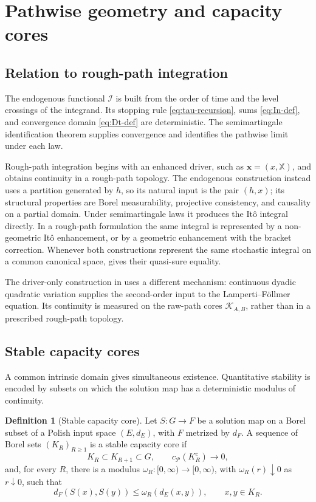 \documentclass[11pt,reqno]{amsart}
\theoremstyle{plain}
\theoremstyle{definition}
\newtheorem{definition}[definition]{Definition}
\newcommand{\cI}{\mathcal I}
\newcommand{\cK}{\mathcal K}
\newcommand{\cP}{\mathcal P}
\begin{document}
\section{Pathwise geometry and capacity cores}
\label{sec:geometry}

\subsection{Relation to rough-path integration}

The endogenous functional \(\cI\) is built from the order of time and the
level crossings of the integrand.  Its stopping rule
\eqref{eq:tau-recursion}, sums \eqref{eq:In-def}, and convergence domain
\eqref{eq:Dt-def} are deterministic.  The semimartingale identification
theorem supplies convergence and identifies the pathwise limit under each
law.

Rough-path integration begins with an enhanced driver, such as
\(\mathbf x=(x,\mathbb X)\), and obtains continuity in a rough-path topology.
The endogenous construction instead uses a partition generated by \(h\), so
its natural input is the pair \((h,x)\); its structural properties are Borel
measurability, projective consistency, and causality on a partial domain.
Under semimartingale laws it produces the It\^o integral directly.  In a
rough-path formulation the same integral is represented by a non-geometric
It\^o enhancement, or by a geometric enhancement with the bracket
correction.  Whenever both constructions represent the same stochastic
integral on a common canonical space,  gives
their quasi-sure equality.

The driver-only construction in  uses a different
mechanism: continuous dyadic quadratic variation supplies the second-order
input to the Lamperti--F\"ollmer equation.  Its continuity is measured on the
raw-path cores \(\cK_{A,B}\), rather than in a prescribed rough-path
topology.

\subsection{Stable capacity cores}

A common intrinsic domain gives simultaneous existence.  Quantitative
stability is encoded by subsets on which the solution map has a deterministic
modulus of continuity.

\begin{definition}[Stable capacity core]\label{def:capacity-core}
Let \(S:G\to F\) be a solution map on a Borel subset of a Polish input space
\((E,d_E)\), with \(F\) metrized by \(d_F\).  A sequence of Borel sets
\((K_R)_{R\ge1}\) is a stable capacity core if
\[
  K_R\subset K_{R+1}\subset G,
  \qquad
  c_{\cP}(K_R^c)\longrightarrow0,
\]
and, for every \(R\), there is a modulus
\(\omega_R:[0,\infty)\to[0,\infty)\), with
\(\omega_R(r)\downarrow0\) as \(r\downarrow0\), such that
\[
  d_F(S(x),S(y))
  \le
  \omega_R(d_E(x,y)),
  \qquad x,y\in K_R.
\]
\end{definition}
\end{document}
